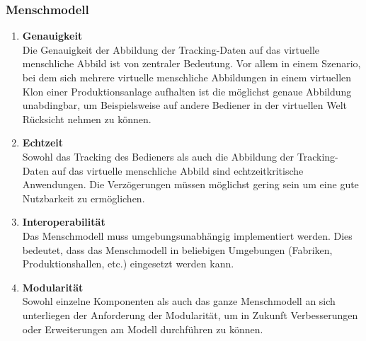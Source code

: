 \subsubsection{Menschmodell}\label{sec:AnforderungenMensch}
\begin{enumerate}
	\item \textbf{Genauigkeit} \\
	Die Genauigkeit der Abbildung der Tracking-Daten auf das virtuelle menschliche Abbild ist von zentraler Bedeutung. Vor allem in einem Szenario, bei dem sich mehrere virtuelle menschliche Abbildungen in einem virtuellen Klon einer Produktionsanlage aufhalten ist die möglichst genaue Abbildung unabdingbar, um Beispielsweise auf andere Bediener in der virtuellen Welt Rücksicht nehmen zu können.
	\item \textbf{Echtzeit} \\
	Sowohl das Tracking des Bedieners als auch die Abbildung der Tracking-Daten auf das virtuelle menschliche Abbild sind echtzeitkritische Anwendungen. Die Verzögerungen müssen möglichst gering sein um eine gute Nutzbarkeit zu ermöglichen.
	\item \textbf{Interoperabilität} \\
	Das Menschmodell muss umgebungsunabhängig implementiert werden. Dies bedeutet, dass das Menschmodell in beliebigen Umgebungen (Fabriken, Produktionshallen, etc.) eingesetzt werden kann.
	\item \textbf{Modularität} \\
	Sowohl einzelne Komponenten als auch das ganze Menschmodell an sich unterliegen der Anforderung der Modularität, um in Zukunft Verbesserungen oder Erweiterungen am Modell durchführen zu können.
\end{enumerate}

